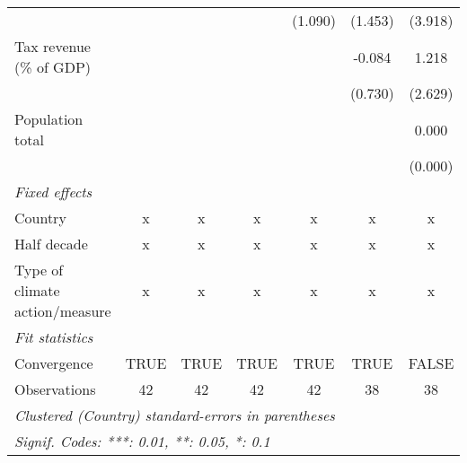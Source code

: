 \begin{tabular}{lcccccc}
                                           &                &               &               & (1.090)        & (1.453)         & (3.918)\\   
   Tax revenue (\% of GDP)                 &                &               &               &                & -0.084          & 1.218\\   
                                           &                &               &               &                & (0.730)         & (2.629)\\   
   Population total                        &                &               &               &                &                 & 0.000\\   
                                           &                &               &               &                &                 & (0.000)\\   
   \emph{Fixed effects}\\
   Country                                 & x              & x             & x             & x              & x               & x\\  
   Half decade                             & x              & x             & x             & x              & x               & x\\  
   Type of climate action/measure          & x              & x             & x             & x              & x               & x\\  
   \midrule \emph{Fit statistics}\\
   Convergence                             &TRUE            & TRUE          & TRUE          & TRUE           & TRUE            & FALSE\\  
   Observations                            & 42             & 42            & 42            & 42             & 38              & 38\\  
   \midrule
   \multicolumn{7}{l}{\emph{Clustered (Country) standard-errors in parentheses}}\\
   \multicolumn{7}{l}{\emph{Signif. Codes: ***: 0.01, **: 0.05, *: 0.1}}\\
\end{tabular}
\par\endgroup


